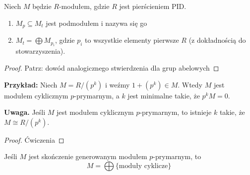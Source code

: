 \begin{theorem}
  Niech $M$ będzie $R$-modułem, gdzie $R$ jest pierścieniem PID.
  \begin{enumerate}
    \item $M_p\subseteq M_t$ jest podmodułem i nazywa się go 
    \item $M_t=\bigoplus M_{p_i}$, gdzie $p_i$ to wszystkie elementy pierwsze $R$ (z dokładnością do stowarzyszenia).
  \end{enumerate}
\end{theorem}

\begin{proof}
  Patrz: dowód analogicznego stwierdzenia dla grup abelowych
\end{proof}

\textbf{Przykład:} Niech $M=R/(p^k)$ i weźmy $1+(p^k)\in M$. Wtedy $M$ jest modułem cyklicznym $p$-prymarnym, a $k$ jest minimalne takie, że $p^kM=0$.

\textbf{\large\color{blue}Uwaga.} Jeśli $M$ jest modułem cyklicznym $p$-prymarnym, to istnieje $k$ takie, że $M\cong R/(p^k)$.

\begin{proof}Ćwiczenia\end{proof}

\begin{theorem} Jeśli $M$ jest skończenie generowanym modułem $p$-prymarnym, to 
  $$M=\bigoplus\{\text{moduły cyklicze}\}$$
\end{theorem}

